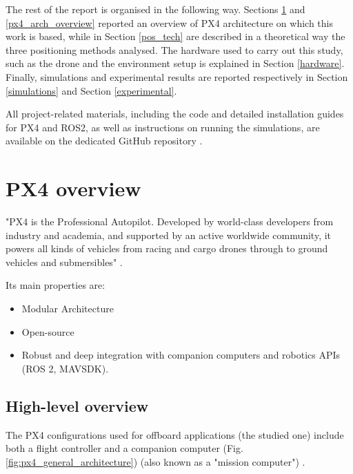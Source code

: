 \documentclass[journal]{IEEEtran}
\begin{document}
The rest of the report is organised in the following way. Sections \ref{px4_overview} and \ref{px4_arch_overview} reported an overview of PX4 architecture on which this work is based, while in Section \ref{pos_tech} are described in a theoretical way the three positioning methods analysed. The hardware used to carry out this study, such as the drone and the environment setup is explained in Section \ref{hardware}. Finally, simulations and experimental results are reported respectively in Section \ref{simulations} and Section \ref{experimental}.

All project-related materials, including the code and detailed installation guides for PX4 and ROS2, as well as instructions on running the simulations, are available on the dedicated GitHub repository \cite{git}.

\section{PX4 overview}
\label{px4_overview}
"PX4 is the Professional Autopilot. Developed by world-class developers from industry and academia, and supported by an active worldwide community, it powers all kinds of vehicles from racing and cargo drones through to ground vehicles and submersibles" \cite{PX4_paper}.

Its main properties are:

\begin{itemize}
    \item Modular Architecture
    \item Open-source
    \item Robust and deep integration with companion computers and robotics APIs (ROS 2, MAVSDK).
\end{itemize}

\subsection{High-level overview}

The PX4 configurations used for offboard applications (the studied one) include both a flight controller and a companion computer (Fig. \ref{fig:px4_general_architecture}) (also known as a "mission computer") \cite{px4_architecture}.
\end{document}
